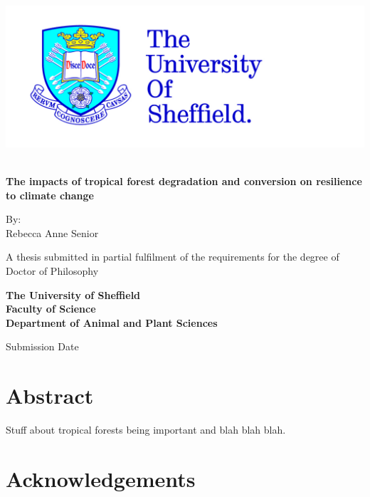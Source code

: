 \documentclass[12pt,a4paper,]{report}
\title{}
\author{}
\date{}
\theoremstyle{definition}
\theoremstyle{definition}
\theoremstyle{definition}
\theoremstyle{remark}
\begin{document}
\thispagestyle{empty}
\begin{center}
\includegraphics{logos/tuoslogo_cmyk_hi.jpg}
\vspace{1.5cm}
 {\Huge\bfseries \\The impacts of tropical forest degradation and conversion on resilience to climate change\par}
 \vspace{1.5cm}
 {\Large By:\\ Rebecca Anne Senior\par}
 \vspace{1.5cm}
 {A thesis submitted in partial fulfilment of the requirements for the degree of\\ Doctor of Philosophy\par}
 \vspace{2cm}\bfseries
 The University of Sheffield\\
 Faculty of Science\\
 Department of Animal and Plant Sciences\par
 \vfill
 {\large {\normalfont Submission Date\par}}
\end{center}

\setlength{\abovedisplayskip}{-5pt}
\setlength{\abovedisplayshortskip}{-5pt}

{
\setcounter{tocdepth}{1}
\tableofcontents
}
\listoftables
\listoffigures
\chapter*{Abstract}\label{abstract}

Stuff about tropical forests being important and blah blah blah.

\pagebreak

\chapter*{Acknowledgements}\label{acknowledgements}
\end{document}
